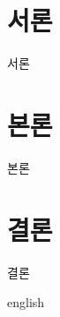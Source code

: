 \documentclass[degree=master]{sgthesis}
\begin{document}
\makefrontmatter

\tableofcontents
\cleardoublepage
\listoffigures
\cleardoublepage
\listoftables
\cleardoublepage

\MakeKoreanAbstract
\cleardoublepage

% 
\chapter{서론}
서론

\chapter{본론}
본론

\chapter{결론}
결론

\cleardoublepage


\ShowBibliographyHeading
\begin{selectlanguage}{english}
\printbibliography[heading=none]
\end{selectlanguage}
\cleardoublepage

\MakeEnglishAbstract
\cleardoublepage
\end{document}
